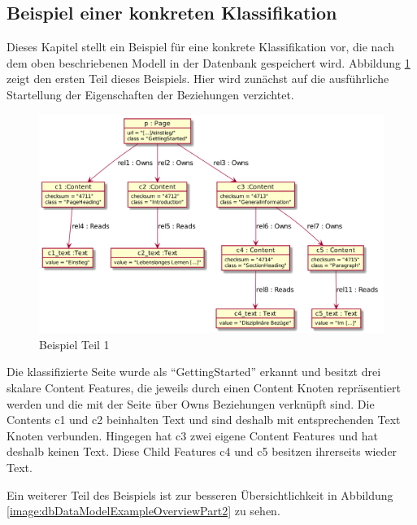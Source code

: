 \subsection{Beispiel einer konkreten Klassifikation}
    Dieses Kapitel stellt ein Beispiel für eine konkrete Klassifikation vor,
    die nach dem oben beschriebenen Modell in der Datenbank gespeichert wird.
    Abbildung \ref{image:dbDataModelExampleOverviewPart1} zeigt den ersten Teil dieses Beispiels.
    Hier wird zunächst auf die ausführliche Startellung der Eigenschaften der Beziehungen verzichtet.

    \begin{figure}[htb]
        \centering
        \includegraphics[width=\textwidth]{../resources/db-data-model/example/example_part1.png}
        \caption{Beispiel Teil 1}
        \label{image:dbDataModelExampleOverviewPart1}
    \end{figure}

    Die klassifizierte Seite wurde als "`GettingStarted"' erkannt und besitzt drei skalare Content Features,
    die jeweils durch einen Content Knoten repräsentiert werden und die mit der Seite über
    Owns Beziehungen verknüpft sind.
    Die Contents c1 und c2 beinhalten Text und sind deshalb mit entsprechenden Text Knoten verbunden.
    Hingegen hat c3 zwei eigene Content Features und hat deshalb keinen Text. %
    Diese Child Features c4 und c5 besitzen ihrerseits wieder Text.

    Ein weiterer Teil des Beispiels ist zur besseren Übersichtlichkeit in
    Abbildung \ref{image:dbDataModelExampleOverviewPart2} zu sehen.

